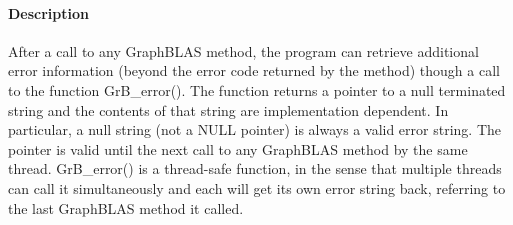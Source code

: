 \paragraph{Description}


After a call to any GraphBLAS method, the program can retrieve additional
error information (beyond the error code returned by the method) though a
call to the function {\sf GrB\_error()}. 
The function returns a pointer to a null terminated string and the contents of that string
are implementation dependent. In particular, a null string (not a {\sf NULL} pointer) is always a valid error string.
The pointer is valid until the next call to any GraphBLAS method by the same thread.
{\sf GrB\_error()} is a thread-safe function, in the sense that multiple threads can
call it simultaneously and each will get its own error string back, referring to the
last GraphBLAS method it called.
